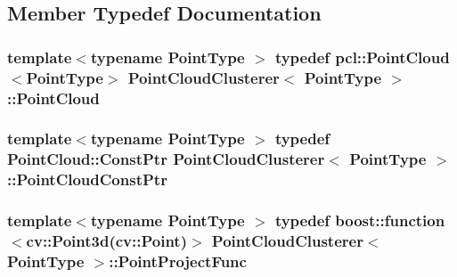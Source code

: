 \subsection{Member Typedef Documentation}
\hypertarget{classPointCloudClusterer_aeac82c7494ccf2580112ef55d7e30b39}{
\subsubsection[{Point\-Cloud}]{\setlength{\rightskip}{0pt plus 5cm}template$<$typename Point\-Type $>$ typedef pcl\-::\-Point\-Cloud$<$Point\-Type$>$ {\bf Point\-Cloud\-Clusterer}$<$ Point\-Type $>$\-::{\bf Point\-Cloud}}}\label{classPointCloudClusterer_aeac82c7494ccf2580112ef55d7e30b39}
\hypertarget{classPointCloudClusterer_a042579611b15a7ae275603b624df3968}{
\subsubsection[{Point\-Cloud\-Const\-Ptr}]{\setlength{\rightskip}{0pt plus 5cm}template$<$typename Point\-Type $>$ typedef Point\-Cloud\-::\-Const\-Ptr {\bf Point\-Cloud\-Clusterer}$<$ Point\-Type $>$\-::{\bf Point\-Cloud\-Const\-Ptr}}}\label{classPointCloudClusterer_a042579611b15a7ae275603b624df3968}
\hypertarget{classPointCloudClusterer_adc13c5f02a2a888f33eedbc33188f202}{
\subsubsection[{Point\-Project\-Func}]{\setlength{\rightskip}{0pt plus 5cm}template$<$typename Point\-Type $>$ typedef boost\-::function$<$cv\-::\-Point3d(cv\-::\-Point)$>$ {\bf Point\-Cloud\-Clusterer}$<$ Point\-Type $>$\-::{\bf Point\-Project\-Func}}}\label{classPointCloudClusterer_adc13c5f02a2a888f33eedbc33188f202}


